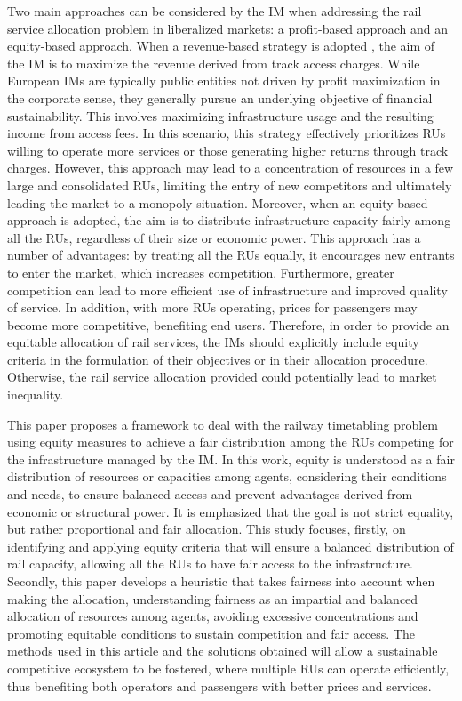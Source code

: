 \documentclass[preprint,12pt]{elsarticle}
\begin{document}
Two main approaches can be considered by the \gls{IM} when addressing the rail service allocation problem in liberalized markets: a profit-based approach and an equity-based approach. When a revenue-based strategy is adopted \cite{DavidMunoz-Valero2025AnAlgorithms}, the aim of the \gls{IM} is to maximize the revenue derived from track access charges. While European \glspl{IM} are typically public entities not driven by profit maximization in the corporate sense, they generally pursue an underlying objective of financial sustainability. This involves maximizing infrastructure usage and the resulting income from access fees. In this scenario, this strategy effectively prioritizes \glspl{RU} willing to operate more services or those generating higher returns through track charges. However, this approach may lead to a concentration of resources in a few large and consolidated \glspl{RU}, limiting the entry of new competitors and ultimately leading the market to a monopoly situation. Moreover, when an equity-based approach \cite{Shao2022Equity-orientedSystem} is adopted, the aim is to distribute infrastructure capacity fairly among all the \glspl{RU}, regardless of their size or economic power. This approach has a number of advantages: by treating all the \glspl{RU} equally, it encourages new entrants to enter the market, which increases competition. Furthermore, greater competition can lead to more efficient use of infrastructure and improved quality of service. In addition, with more \glspl{RU} operating, prices for passengers may become more competitive, benefiting end users. Therefore, in order to provide an equitable allocation of rail services, the \glspl{IM} should explicitly include equity criteria in the formulation of their objectives or in their allocation procedure. Otherwise, the rail service allocation provided could potentially lead to market inequality.

This paper proposes a framework to deal with the railway timetabling problem using equity measures to achieve a fair distribution among the \glspl{RU} competing for the infrastructure managed by the \gls{IM}. In this work, equity is understood as a fair distribution of resources or capacities among agents, considering their conditions and needs, to ensure balanced access and prevent advantages derived from economic or structural power. It is emphasized that the goal is not strict equality, but rather proportional and fair allocation. This study focuses, firstly, on identifying and applying equity criteria that will ensure a balanced distribution of rail capacity, allowing all the \glspl{RU} to have fair access to the infrastructure. Secondly, this paper develops a heuristic that takes fairness into account when making the allocation, understanding fairness as an impartial and balanced allocation of resources among agents, avoiding excessive concentrations and promoting equitable conditions to sustain competition and fair access. The methods used in this article and the solutions obtained will allow a sustainable competitive ecosystem to be fostered, where multiple \glspl{RU} can operate efficiently, thus benefiting both operators and passengers with better prices and services.
\end{document}
